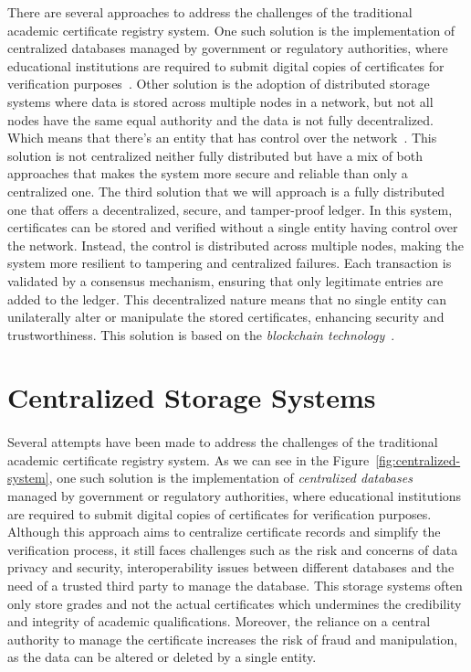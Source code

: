 There are several approaches to address the challenges of the traditional academic certificate registry system. One such solution is the implementation of centralized databases managed by government or regulatory authorities,
where educational institutions are required to submit digital copies of certificates for verification purposes~\cite{LinWays}.
Other solution is the adoption of distributed storage systems where data is stored across multiple nodes in a network, but not all nodes have the same equal authority and the data is not fully decentralized. Which means that there's an entity that has control over the network~\cite{sharples2016blockchain}.
This solution is not centralized neither fully distributed but have a mix of both approaches that makes the system more secure and reliable than only a centralized one.
The third solution that we will approach is a fully distributed one that offers a decentralized, secure, and tamper-proof ledger. In this system, certificates can be stored and verified without a single entity having control over the network. Instead, the control is distributed across multiple nodes, making the system more resilient to tampering and centralized failures. Each transaction is validated by a consensus mechanism, ensuring that only legitimate entries are added to the ledger. This decentralized nature means that no single entity can unilaterally alter or manipulate the stored certificates, enhancing security and trustworthiness. This solution is based on the \textit{blockchain technology}~\cite{app14020706, saleh2020blockchain}.

\section{Centralized Storage Systems}\label{sec:centralized-systems}
\paragraph{}

Several attempts have been made to address the challenges of the traditional academic certificate registry system.
As we can see in the Figure~\ref{fig:centralized-system}, one such solution is the implementation of \textit{centralized databases}~\cite{OLSON200971} managed by government or regulatory authorities, where educational institutions are required to
submit digital copies of certificates for verification purposes. Although this approach aims to centralize certificate records and simplify the verification process, it still faces challenges
such as the risk and concerns of data privacy and security, interoperability issues between different databases and the need of a trusted third party to manage the database.
This storage systems often only store grades and not the actual certificates which undermines the credibility and integrity of academic qualifications.
Moreover, the reliance on a central authority to manage the certificate increases the risk of fraud and manipulation, as the data can be altered or deleted by a single entity.

